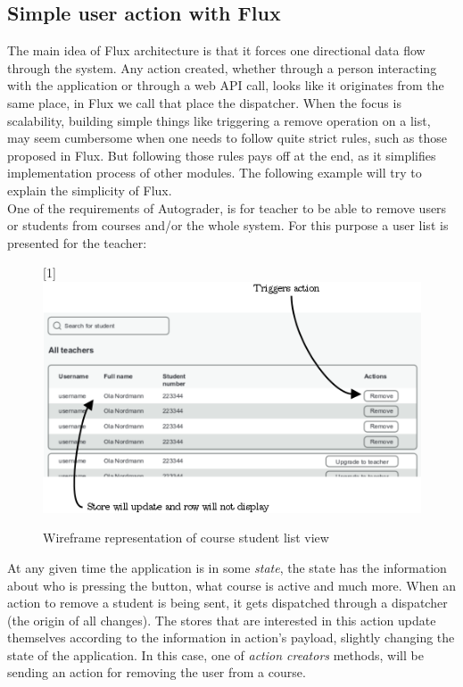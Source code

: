 \subsection{Simple user action with Flux}\label{sec:simplefluxexample}
The main idea of Flux architecture is that it forces one directional data flow through the system. Any action created, whether through a person interacting with the application or through a web API call, looks like it originates from the same place, in Flux we call that place the dispatcher. When the focus is scalability, building simple things like triggering a remove operation on a list, may seem cumbersome when one needs to follow quite strict rules, such as those proposed in Flux. But following those rules pays off at the end, as it simplifies implementation process of other modules. The following example will try to explain the simplicity of Flux.
\\One of the requirements of Autograder, is for teacher to be able to remove users or students from courses and/or the whole system. For this purpose a user list is presented for the teacher:
\begin{figure}[h]
  \scalebox{1}[1]{{\includegraphics[width=1\linewidth]{graphics/simpleremoveuser.png}}}
  \caption{Wireframe representation of course student list view}
  \label{fig:simpleremoveuser}
\end{figure}

At any given time the application is in some \emph{state}, the state has the information about who is pressing the button, what course is active and much more. When an action to remove a student is being sent, it gets dispatched through a dispatcher (the origin of all changes). The stores that are interested in this action update themselves according to the information in action's payload, slightly changing the state of the application. In this case, one of \emph{action creators} methods, will be sending an action for removing the user from a course.

